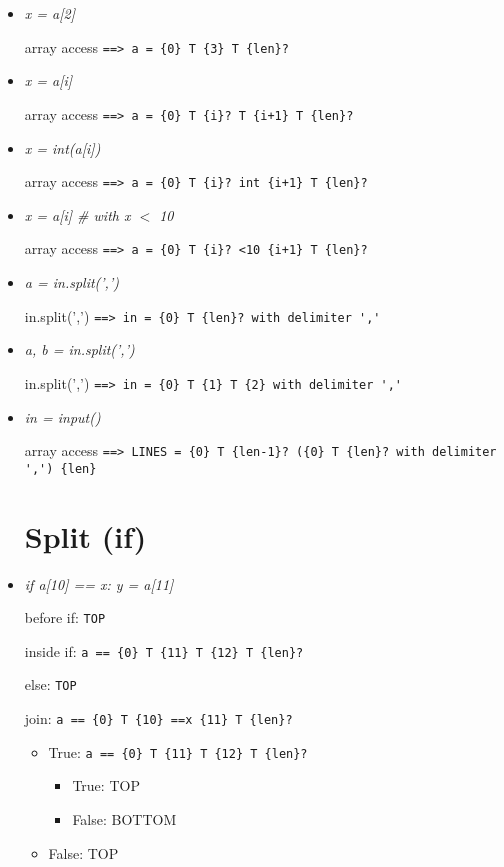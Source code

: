 \documentclass[11pt]{article}
\begin{document}
\begin{itemize}
\item \textit{x = a[2]}

array access \verb|==> a = {0} T {3} T {len}?|


\item \textit{x = a[i]}

array access \verb|==> a = {0} T {i}? T {i+1} T {len}?|


\item \textit{x = int(a[i])}

array access \verb|==> a = {0} T {i}? int {i+1} T {len}?|


\item \textit{x = a[i] \# with x $<$ 10}

array access \verb|==> a = {0} T {i}? <10 {i+1} T {len}?|


\item \textit{a = in.split(',')}

in.split(',') \verb|==> in = {0} T {len}? with delimiter ','|


\item \textit{a, b = in.split(',')}

in.split(',') \verb|==> in = {0} T {1} T {2} with delimiter ','|


\item \textit{in = input()}

array access \verb|==> LINES = {0} T {len-1}? ({0} T {len}? with delimiter ',') {len}|


\section{Split (if)}

\item \textit{if a[10] == x: y = a[11]}

before if: \verb|TOP|

inside if: \verb|a == {0} T {11} T {12} T {len}?|

else: \verb|TOP|

join: \verb|a == {0} T {10} ==x {11} T {len}?|
\begin{itemize}
\item True: \verb|a == {0} T {11} T {12} T {len}?|
\begin{itemize}
\item True: TOP
\item False: BOTTOM
\end{itemize}
\item False: TOP
\end{itemize}



\end{itemize}
\end{document}
